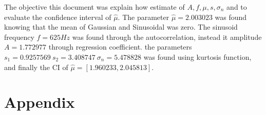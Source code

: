 \documentclass[conference]{IEEEtran}
\begin{document}
The objective this document was explain how estimate of \begin{math} A, f , \mu , s, \sigma_n
\end{math} and to evaluate the confidence interval of \begin{math}
	 \hat{\mu}
\end{math}. The parameter \begin{math} \hat{\mu}=2.003023 \end{math} was found knowing that the mean of Gaussian and Sinusoidal was zero. The sinusoid frequency \begin{math}  f = 625 Hz \end{math} was found through the autocorrelation, instead it amplitude \begin{math}  A = 1.772977 \end{math} through regression coefficient. the parameters \begin{math} s_1=0.9257569 \ s_2=3.408747 \ \sigma_n=5.478828 \end{math} was found using kurtosis function, and finally the CI of \begin{math} \hat{\mu}=[1.960233,2.045813] \end{math}. 


\section{Appendix}
\end{document}
